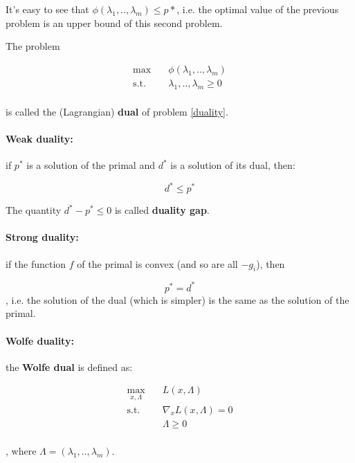 It's easy to see that $\phi(\lambda_1, .., \lambda_m) \leq p*$, i.e. the optimal value of the previous problem is an upper bound of this second problem.

The problem 

\begin{equation*}\label{eq_svm2}
\begin{aligned}
\max \quad & \phi(\lambda_1, .., \lambda_m)\\
\textrm{s.t.} \quad & \lambda_1, .., \lambda_m \geq 0  \\
\end{aligned}
\end{equation*}

is called the (Lagrangian) \textbf{dual} of problem \ref{duality}.

\paragraph{Weak duality:} if $p^*$ is a solution of the primal and $d^*$ is a solution of its dual, then:

$$
d^* \leq p^*
$$

The quantity $d^* - p^* \leq 0$ is called \textbf{duality gap}.

\paragraph{Strong duality:} if the function $f$ of the primal is convex (and so are all $-g_i$), then

$$
p^* = d^*
$$
, i.e. the solution of the dual (which is simpler) is the same as the solution of the primal.

\paragraph{Wolfe duality:} the \textbf{Wolfe dual} is defined as:

\begin{equation*}\label{eq_svm2}
\begin{aligned}
\max_{x,\Lambda} \quad & L(x,\Lambda)\\
\textrm{s.t.} \quad & \nabla_x L(x,\Lambda) = 0  \\
\textrm{    } \quad & \Lambda \geq 0  \\
\end{aligned}
\end{equation*}

, where $\Lambda = (\lambda_1, .., \lambda_m)$.

